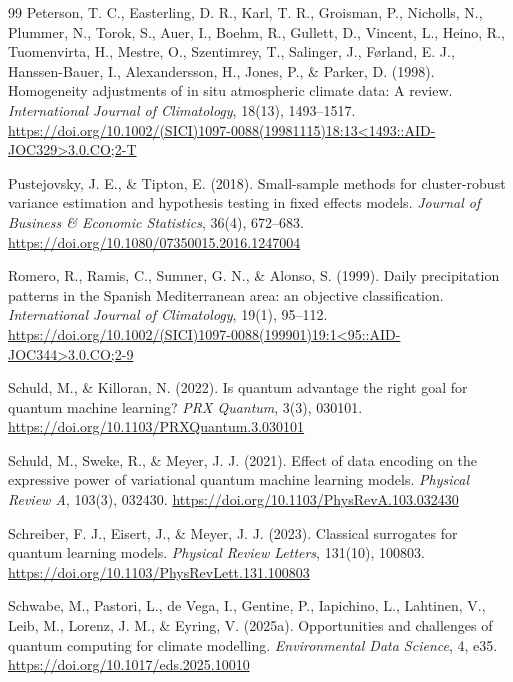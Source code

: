 \documentclass[11pt,a4paper]{article}
\begin{document}
\begin{thebibliography}{99}
Peterson, T. C., Easterling, D. R., Karl, T. R., Groisman, P., Nicholls, N., Plummer, N., Torok, S., Auer, I., Boehm, R., Gullett, D., Vincent, L., Heino, R., Tuomenvirta, H., Mestre, O., Szentimrey, T., Salinger, J., F\o rland, E. J., Hanssen-Bauer, I., Alexandersson, H., Jones, P., \& Parker, D. (1998). Homogeneity adjustments of in situ atmospheric climate data: A review. \textit{International Journal of Climatology}, 18(13), 1493--1517. \url{https://doi.org/10.1002/(SICI)1097-0088(19981115)18:13<1493::AID-JOC329>3.0.CO;2-T}

Pustejovsky, J. E., \& Tipton, E. (2018). Small-sample methods for cluster-robust variance estimation and hypothesis testing in fixed effects models. \textit{Journal of Business \& Economic Statistics}, 36(4), 672--683. \url{https://doi.org/10.1080/07350015.2016.1247004}

Romero, R., Ramis, C., Sumner, G. N., \& Alonso, S. (1999). Daily precipitation patterns in the Spanish Mediterranean area: an objective classification. \textit{International Journal of Climatology}, 19(1), 95--112. \url{https://doi.org/10.1002/(SICI)1097-0088(199901)19:1<95::AID-JOC344>3.0.CO;2-9}

Schuld, M., \& Killoran, N. (2022). Is quantum advantage the right goal for quantum machine learning? \textit{PRX Quantum}, 3(3), 030101. \url{https://doi.org/10.1103/PRXQuantum.3.030101}

Schuld, M., Sweke, R., \& Meyer, J. J. (2021). Effect of data encoding on the expressive power of variational quantum machine learning models. \textit{Physical Review A}, 103(3), 032430. \url{https://doi.org/10.1103/PhysRevA.103.032430}

Schreiber, F. J., Eisert, J., \& Meyer, J. J. (2023). Classical surrogates for quantum learning models. \textit{Physical Review Letters}, 131(10), 100803. \url{https://doi.org/10.1103/PhysRevLett.131.100803}

Schwabe, M., Pastori, L., de Vega, I., Gentine, P., Iapichino, L., Lahtinen, V., Leib, M., Lorenz, J. M., \& Eyring, V. (2025a). Opportunities and challenges of quantum computing for climate modelling. \textit{Environmental Data Science}, 4, e35. \url{https://doi.org/10.1017/eds.2025.10010}



\end{thebibliography}
\end{document}
